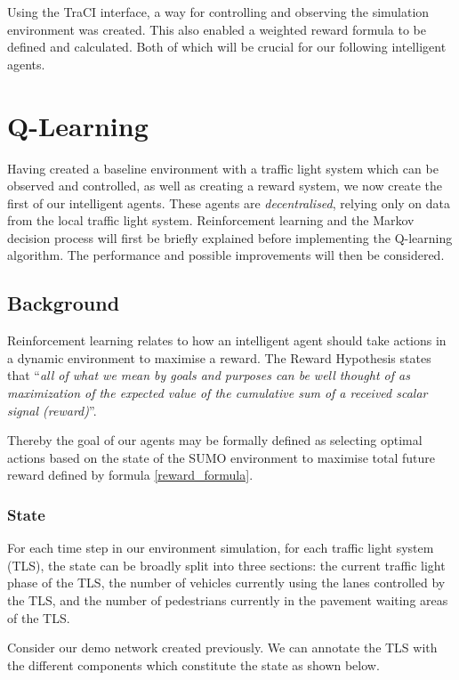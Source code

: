 \documentclass[a4paper]{report}
\begin{document}
Using the TraCI interface, a way for controlling and observing the simulation environment was created. This also enabled a weighted reward formula to be defined and calculated. Both of which will be crucial for our following intelligent agents.

\chapter{Q-Learning} \label{chapter:q_learning}

Having created a baseline environment with a traffic light system which can be observed and controlled, as well as creating a reward system, we now create the first of our intelligent agents. These agents are \emph{decentralised}, relying only on data from the local traffic light system. Reinforcement learning and the Markov decision process will first be briefly explained before implementing the Q-learning algorithm. The performance and possible improvements will then be considered.

\section{Background}

Reinforcement learning relates to how an intelligent agent should take actions in a dynamic environment to maximise a reward. The Reward Hypothesis states that ``\emph{all of what we mean by goals and purposes can be well thought of as maximization of the expected value of the cumulative sum of a received scalar signal (reward)}''\cite{RichardSutton1990}.

Thereby the goal of our agents may be formally defined as selecting optimal actions based on the state of the SUMO environment to maximise total future reward defined by formula \eqref{reward_formula}.

\subsection{State} \label{q_learning_state}

For each time step in our environment simulation, for each traffic light system (TLS), the state can be broadly split into three sections: the current traffic light phase of the TLS, the number of vehicles currently using the lanes controlled by the TLS, and the number of pedestrians currently in the pavement waiting areas of the TLS.

Consider our demo network created previously. We can annotate the TLS with the different components which constitute the state as shown below.
\end{document}
